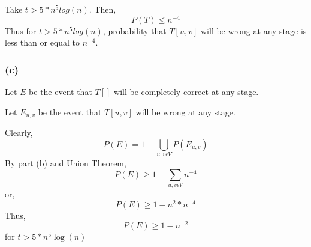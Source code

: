 \documentclass[a4paper]{article}
\begin{document}
Take $t > 5*n^5log(n)$. Then, $$P(T) \leq n^{-4}$$
Thus for $t > 5*n^5log(n)$, probability that $T[u,v]$ will be wrong at any stage is less than or equal to $n^{-4}$.

\subsubsection*{(c)}
Let $E$ be the event that $T[]$ will be completely correct at any stage.

Let $E_{u,v}$ be the event that $T[u,v]$ will be wrong at any stage.

Clearly, $$P(E) = 1 - \bigcup\limits_{u,v \epsilon V} P(E_{u,v})$$
By part (b) and Union Theorem, 
$$P(E) \geq 1 - \sum\limits_{u,v \epsilon V} n^{-4}$$
or,
$$P(E) \geq 1 - n^2*n^{-4}$$
Thus, $$P(E) \geq 1 - n^{-2}$$ for $t > 5*n^5\log (n)$

 
\end{document}
